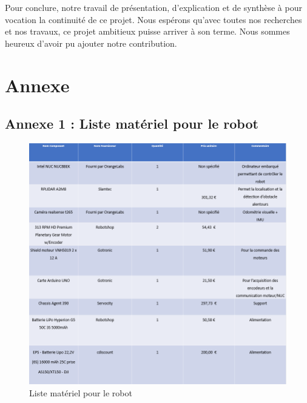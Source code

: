\documentclass[french]{rapportENSTAB}
\begin{document}
Pour conclure, notre travail de présentation, d'explication et de synthèse à pour vocation la continuité de ce projet. Nous espérons qu'avec toutes nos recherches et nos travaux, ce projet ambitieux puisse arriver à son terme. Nous sommes heureux d'avoir pu ajouter notre contribution.

\pagebreak
\listoffigures

\pagebreak
\section{Annexe}
\subsection{Annexe 1 : Liste matériel pour le robot}

\begin{figure}[H]
     \centering
     \includegraphics[scale=0.7]{images/robot/liste_composants_robot.png}
     \caption{Liste matériel pour le robot}
     \label{matos}
\end{figure}
\end{document}
